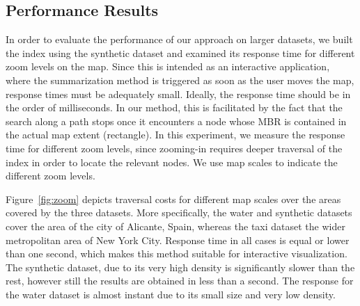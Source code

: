 \vspace{-5pt}
\subsection{Performance Results}
\label{subsec:benchmarking}

In order to evaluate the performance of our approach on larger datasets, we built the index using the synthetic dataset and examined its response time for different zoom levels on the map. Since this is intended as an interactive application, where the summarization method is triggered as soon as the user moves the map, response times must be adequately small. Ideally, the response time should be in the order of milliseconds. In our method, this is facilitated by the fact that the search along a path stops once it encounters a node whose MBR is contained in the actual map extent (rectangle). In this experiment, we measure the response time for different zoom levels, since zooming-in requires deeper traversal of the \btsr index in order to locate the relevant nodes. We use map scales to indicate the different zoom levels. 




Figure~\ref{fig:zoom} depicts traversal costs for different map scales over the areas covered by the three datasets. More specifically, the water and synthetic datasets cover the area of the city of Alicante, Spain, whereas the taxi dataset the wider metropolitan area of New York City. Response time in all cases is equal or lower than one second, which makes this method suitable for interactive visualization. The synthetic dataset, due to its very high density is significantly slower than the rest, however still the results are obtained in less than a second. The response for the water dataset is almost instant due to its small size and very low density.

